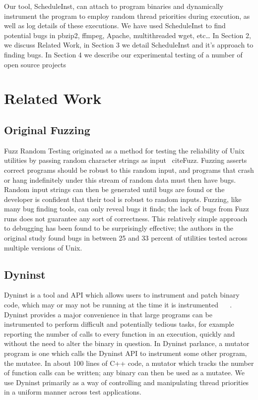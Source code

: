 \documentclass[10pt,]{article} %
\begin{document}
	Our tool, ScheduleInst, can attach to program binaries and dynamically instrument the program to employ random thread priorities during execution, as well as log details of these executions.  We have used ScheduleInst to find potential bugs in pbzip2, ffmpeg, Apache, multithreaded wget, etc…  In Section 2, we discuss Related Work, in Section 3 we detail ScheduleInst and it’s approach to finding bugs.  In Section 4 we describe our experimental testing of a number of open source projects  


\section{Related Work}


\subsection{Original Fuzzing}


Fuzz Random Testing originated as a method for testing the reliability of Unix utilities by passing random character strings as input ~cite{Fuzz}.  Fuzzing asserts correct programs should be robust to this random input, and programs that crash or hang indefinitely under this stream of random data must then have bugs. Random input strings can then be generated until bugs are found or the developer is confident that their tool is robust to random inputs.  Fuzzing, like many bug finding tools, can only reveal bugs it finds; the lack of bugs from Fuzz runs does not guarantee any sort of correctness.  This relatively simple approach to debugging has been found to be surprisingly effective; the authors in the original study found bugs in between 25 and 33 percent of utilities tested across multiple versions of Unix.      




\subsection{Dyninst}

Dyninst is a tool and API which allows users to instrument and patch binary code, which may or may not be running at the time it is instrumented ~\cite{Dyninst1} ~\cite{Dyninst2}.   Dyninst provides a major convenience in that large programs can be instrumented to perform difficult and potentially tedious tasks, for example reporting the number of calls to every function in an execution, quickly and without the need to alter the binary in question.  In Dyninst parlance, a mutator program is one which calls the Dyninst API to instrument some other program, the mutatee.   In about 100 lines of C++ code, a mutator which tracks the number of function calls can be written; any binary can then be used as a mutatee.  We use Dyninst primarily as a way of controlling and manipulating thread priorities in a uniform manner across test applications.  
\end{document}
